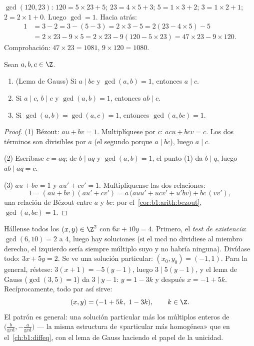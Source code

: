 \begin{example}\label{ex:b1:arith:euclid}
$\gcd(120, 23)$: $120 = 5 \times 23 + 5$; $23 = 4 \times 5 + 3$;
$5 = 1\times 3 + 2$; $3 = 1 \times 2 + 1$; $2 = 2 \times 1 + 0$. Luego
$\gcd = 1$. Hacia atrás:
\begin{align*}
1 &= 3 - 2 = 3 - (5 - 3) = 2\times 3 - 5 = 2(23 - 4\times 5) - 5 \\
&= 2 \times 23 - 9 \times 5 = 2\times 23 - 9(120 - 5\times 23)
= 47 \times 23 - 9 \times 120 .
\end{align*}
Comprobación: $47 \times 23 = 1081$, $9 \times 120 = 1080$.
\end{example}

\begin{theorem}\label{thm:b1:arith:gauss}
Sean $a, b, c \in \Z$.
\begin{enumerate}
  \item (Lema de Gauss) Si $a \mid bc$ y
        $\gcd(a, b) = 1$, entonces $a \mid c$.
  \item Si $a \mid c$, $b \mid c$ y $\gcd(a,b) = 1$, entonces
        $ab \mid c$.
  \item Si $\gcd(a, b) = \gcd(a, c) = 1$, entonces $\gcd(a, bc) = 1$.
\end{enumerate}
\end{theorem}

\begin{proof}
(1) Bézout: $au + bv = 1$. Multiplíquese por $c$: $acu + bcv = c$. Los
dos términos son divisibles por $a$ (el segundo porque $a \mid bc$),
luego $a \mid c$.

(2) Escríbase $c = aq$; de $b \mid aq$ y $\gcd(a, b) = 1$, el punto (1)
da $b \mid q$, luego $ab \mid aq = c$.

(3) $au + bv = 1$ y $au' + cv' = 1$. Multiplíquense las dos
relaciones:
\[
1 = (au + bv)(au' + cv')
= a\,\bigl(auu' + ucv' + u'bv\bigr) + bc\,(vv') ,
\]
una relación de Bézout entre $a$ y $bc$: por
el~\cref{cor:b1:arith:bezout}, $\gcd(a, bc) = 1$.
\end{proof}

\begin{example}\label{ex:b1:arith:diophantine}
Hállense todos los $(x, y) \in \Z^2$ con $6x + 10y = 4$. Primero, el
\emph{test de existencia}: $\gcd(6, 10) = 2$  a $4$, luego hay
soluciones (si el mcd no dividiese al miembro derecho, el izquierdo
sería siempre múltiplo suyo y no habría ninguna). Divídase todo:
$3x + 5y = 2$. Se ve una solución particular: $(x_0, y_0) = (-1, 1)$.
Para la general, réstese: $3(x + 1) = -5(y - 1)$, luego
$3 \mid 5(y-1)$, y el lema de Gauss ($\gcd(3,5) = 1$) da
$3 \mid y - 1$: $y = 1 - 3k$ y después $x = -1 + 5k$. Recíprocamente,
todo par así sirve:
\[
(x, y) = (-1 + 5k,\ 1 - 3k), \qquad k \in \Z .
\]
El patrón es general: una solución particular más los múltiplos
enteros de $\bigl(\frac b{\gcd}, -\frac a{\gcd}\bigr)$ --- la misma
estructura de «particular más homogénea» que en
el~\cref{ch:b1:diffeq}, con el lema de Gauss haciendo el papel de la
unicidad.
\end{example}

